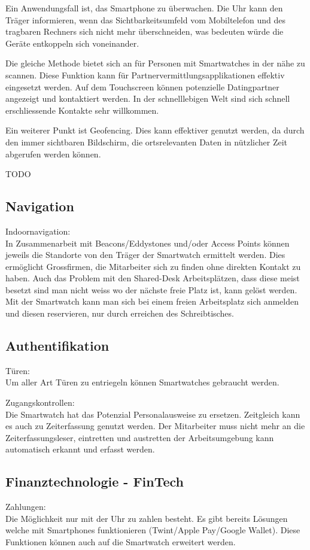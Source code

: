 Ein Anwendungsfall ist, das Smartphone zu überwachen. Die Uhr kann den Träger informieren, wenn das Sichtbarkeitsumfeld vom Mobiltelefon und des tragbaren Rechners sich nicht mehr überschneiden, was bedeuten würde die Geräte entkoppeln sich voneinander.

Die gleiche Methode bietet sich an für Personen mit Smartwatches in der nähe zu scannen. Diese Funktion kann für Partnervermittlungsapplikationen effektiv eingesetzt werden. Auf dem Touchscreen können potenzielle Datingpartner angezeigt und kontaktiert werden. In der schnelllebigen Welt sind sich schnell erschliessende Kontakte sehr willkommen.

Ein weiterer Punkt ist Geofencing. Dies kann effektiver genutzt werden, da durch den immer sichtbaren Bildschirm, die ortsrelevanten Daten  in nützlicher Zeit abgerufen werden können.

TODO

\subsection{Navigation}
Indoornavigation:\\
In Zusammenarbeit mit Beacons/Eddystones und/oder Access Points können jeweils die Standorte von den Träger der Smartwatch ermittelt werden.
Dies ermöglicht Grossfirmen, die Mitarbeiter sich zu finden ohne direkten Kontakt zu haben.
Auch das Problem mit den Shared-Desk Arbeitsplätzen, dass diese meist besetzt sind man nicht weiss wo der nächste freie Platz ist, kann gelöst werden.
Mit der Smartwatch kann man sich bei einem freien Arbeitsplatz sich anmelden und diesen reservieren, nur durch erreichen des Schreibtisches.

\subsection{Authentifikation}
Türen:\\
Um aller Art Türen zu entriegeln können Smartwatches gebraucht werden.

Zugangskontrollen:\\
Die Smartwatch hat das Potenzial Personalausweise zu ersetzen. Zeitgleich kann es auch zu Zeiterfassung genutzt werden.
Der Mitarbeiter muss nicht mehr an die Zeiterfassungsleser, eintretten und austretten der Arbeitsumgebung kann automatisch erkannt und erfasst werden.

\subsection{Finanztechnologie - FinTech}
Zahlungen:\\
Die Möglichkeit nur mit der Uhr zu zahlen besteht. Es gibt bereits Lösungen welche mit Smartphones funktionieren {(Twint/Apple Pay/Google Wallet)}.
Diese Funktionen können auch auf die Smartwatch erweitert werden.

